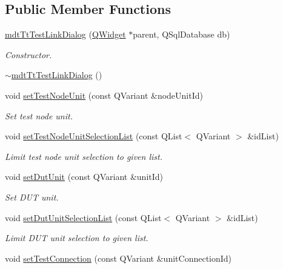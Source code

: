 \subsection*{Public Member Functions}
\begin{DoxyCompactItemize}
\item 
\hyperlink{classmdt_tt_test_link_dialog_ac65efc1af939c5059176651d65d3c7ae}{mdt\-Tt\-Test\-Link\-Dialog} (\hyperlink{class_q_widget}{Q\-Widget} $\ast$parent, Q\-Sql\-Database db)
\begin{DoxyCompactList}\small\item\em Constructor. \end{DoxyCompactList}\item 
\hyperlink{classmdt_tt_test_link_dialog_a5732e2c5680256dd468540ae47172fbe}{$\sim$mdt\-Tt\-Test\-Link\-Dialog} ()
\item 
void \hyperlink{classmdt_tt_test_link_dialog_a0816b61e02e5b82699bdbc2fdedb098f}{set\-Test\-Node\-Unit} (const Q\-Variant \&node\-Unit\-Id)
\begin{DoxyCompactList}\small\item\em Set test node unit. \end{DoxyCompactList}\item 
void \hyperlink{classmdt_tt_test_link_dialog_a05d0bcebecccd2bcc59aa1d8e1d04e05}{set\-Test\-Node\-Unit\-Selection\-List} (const Q\-List$<$ Q\-Variant $>$ \&id\-List)
\begin{DoxyCompactList}\small\item\em Limit test node unit selection to given list. \end{DoxyCompactList}\item 
void \hyperlink{classmdt_tt_test_link_dialog_a0a67dbfcdac8800ef091fc040539b148}{set\-Dut\-Unit} (const Q\-Variant \&unit\-Id)
\begin{DoxyCompactList}\small\item\em Set D\-U\-T unit. \end{DoxyCompactList}\item 
void \hyperlink{classmdt_tt_test_link_dialog_a02daf0a705e224f518a6ba67ffbe1df4}{set\-Dut\-Unit\-Selection\-List} (const Q\-List$<$ Q\-Variant $>$ \&id\-List)
\begin{DoxyCompactList}\small\item\em Limit D\-U\-T unit selection to given list. \end{DoxyCompactList}\item 
void \hyperlink{classmdt_tt_test_link_dialog_a0466396e733c0e20f5c8fe1cc11fb8ec}{set\-Test\-Connection} (const Q\-Variant \&unit\-Connection\-Id)

\end{DoxyCompactItemize}
